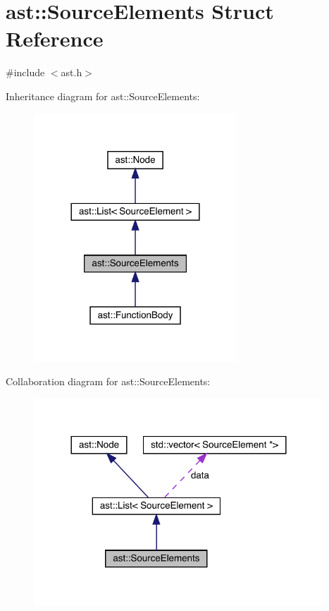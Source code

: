 \hypertarget{structast_1_1_source_elements}{}\section{ast\+:\+:Source\+Elements Struct Reference}
\label{structast_1_1_source_elements}


{\ttfamily \#include $<$ast.\+h$>$}



Inheritance diagram for ast\+:\+:Source\+Elements\+:
\nopagebreak
\begin{figure}[H]
\begin{center}
\leavevmode
\includegraphics[width=216pt]{structast_1_1_source_elements__inherit__graph}
\end{center}
\end{figure}


Collaboration diagram for ast\+:\+:Source\+Elements\+:
\nopagebreak
\begin{figure}[H]
\begin{center}
\leavevmode
\includegraphics[width=308pt]{structast_1_1_source_elements__coll__graph}
\end{center}
\end{figure}
